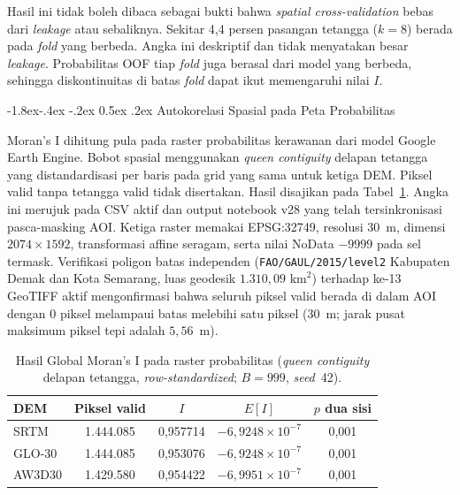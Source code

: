 \documentclass[12pt,a4paper]{article}
\makeatletter
\renewcommand\subsubsection{\@startsection{subsubsection}{3}{\z@}%
  {-1.8ex\@plus -.4ex \@minus -.2ex}%
  {0.5ex \@plus .2ex}%
  {\normalfont\normalsize\bfseries}}
\makeatother
\begin{document}
Hasil ini tidak boleh dibaca sebagai bukti bahwa \textit{spatial
cross-validation} bebas dari \textit{leakage} atau sebaliknya. Sekitar 4,4
persen pasangan tetangga ($k=8$) berada pada \textit{fold} yang berbeda.
Angka ini deskriptif dan tidak menyatakan besar \textit{leakage}. Probabilitas
OOF tiap \textit{fold} juga berasal dari model yang berbeda, sehingga
diskontinuitas di batas \textit{fold} dapat ikut memengaruhi nilai $I$.

\subsubsection{Autokorelasi Spasial pada Peta Probabilitas}

Moran's I dihitung pula pada raster probabilitas kerawanan dari model Google
Earth Engine. Bobot spasial menggunakan \textit{queen contiguity} delapan
tetangga yang distandardisasi per baris pada grid yang sama untuk ketiga DEM.
Piksel valid tanpa tetangga valid tidak disertakan. Hasil disajikan pada
Tabel~\ref{tab:moran-raster}. Angka ini merujuk pada CSV aktif dan output notebook
v28 yang telah tersinkronisasi pasca-masking AOI. Ketiga raster memakai
EPSG:32749, resolusi 30~m, dimensi $2074\times1592$, transformasi affine
seragam, serta nilai NoData $-9999$ pada sel termask. Verifikasi poligon
batas independen (\texttt{FAO/GAUL/2015/level2} Kabupaten Demak dan Kota
Semarang, luas geodesik $1.310{,}09\text{ km}^2$) terhadap ke-13 GeoTIFF
aktif mengonfirmasi bahwa seluruh piksel valid berada di dalam AOI dengan 0
piksel melampaui batas melebihi satu piksel ($30$~m; jarak pusat maksimum
piksel tepi adalah $5{,}56$~m).

\begin{table}[!htbp]
\small
\centering
\caption[Hasil Global Moran's I pada raster probabilitas]{Hasil Global Moran's I pada raster probabilitas (\textit{queen
contiguity} delapan tetangga, \textit{row-standardized}; $B=999$, \textit{seed}~42).}
\label{tab:moran-raster}
\begin{tabular}{lcccc}
\toprule
\textbf{DEM} & \textbf{Piksel valid} & \textbf{$I$} & \textbf{$E[I]$} & \textbf{$p$ dua sisi} \\
\midrule
SRTM   & 1.444.085 & 0,957714 & $-6{,}9248 \times 10^{-7}$ & 0,001 \\
GLO-30 & 1.444.085 & 0,953076 & $-6{,}9248 \times 10^{-7}$ & 0,001 \\
AW3D30 & 1.429.580 & 0,954422 & $-6{,}9951 \times 10^{-7}$ & 0,001 \\
\bottomrule
\end{tabular}
\end{table}
\end{document}
